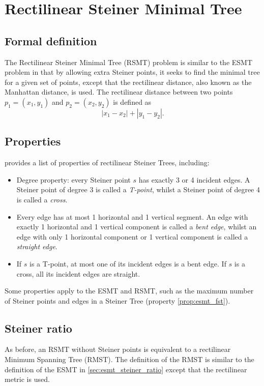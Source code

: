 \documentclass{l4proj}
\begin{document}
\section{Rectilinear Steiner Minimal Tree}
\subsection{Formal definition}
The Rectilinear Steiner Minimal Tree (RSMT) problem is similar to the ESMT problem in that by allowing extra Steiner points, it seeks to find the minimal tree for a given set of points, except that the rectilinear distance, also known as the Manhattan distance, is used. The rectilinear distance between two points $p_1 = (x_1, y_1)$ and $p_2 = (x_2, y_2)$ is defined as
$$|x_1 - x_2| + |y_1 - y_2|.$$
\subsection{Properties}
\cite{Brazil2015} provides a list of properties of rectilinear Steiner Trees, including:

\begin{itemize}
    \item Degree property: every Steiner point $s$ has exactly 3 or 4 incident edges. A Steiner point of degree 3 is called a \textit{T-point}, whilst a Steiner point of degree 4 is called a \textit{cross}.
    \item Every edge has at most 1 horizontal and 1 vertical segment. An edge with exactly 1 horizontal and 1 vertical component is called a \textit{bent edge}, whilst an edge with only 1 horizontal component or 1 vertical component is called a \textit{straight edge}.
    \item If $s$ is a T-point, at most one of its incident edges is a bent edge. If $s$ is a cross, all its incident edges are straight.
\end{itemize}
\label{sec:rsmt_properties}
Some properties apply to the ESMT and RSMT, such as the maximum number of Steiner points and edges in a Steiner Tree (property \ref{prop:esmt_fst}).

\subsection{Steiner ratio}
As before, an RSMT without Steiner points is equivalent to a rectilinear Minimum Spanning Tree (RMST). The definition of the RMST is similar to the definition of the ESMT in \ref{sec:esmt_steiner_ratio} except that the rectilinear metric is used.
\end{document}
